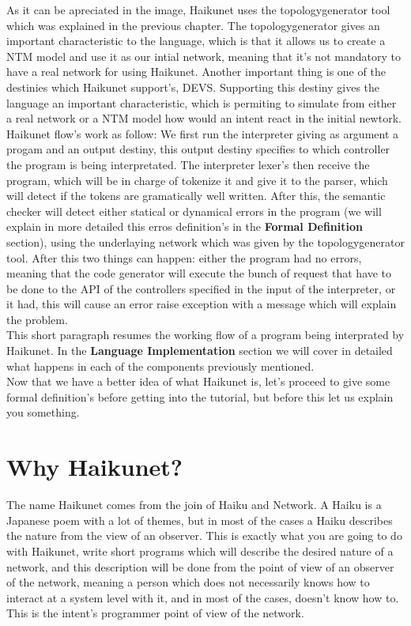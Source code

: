 As it can be apreciated in the image, Haikunet uses the topologygenerator tool which was explained in the previous chapter. The topologygenerator gives an important characteristic to the language, which is that it allows us to create a NTM model and use it as our intial network, meaning that it's not mandatory to have a real network for using Haikunet. Another important thing is one of the destinies which Haikunet support's, DEVS. Supporting this destiny gives the language an important characteristic, which is permiting to simulate from either a real network or a NTM model how would an intent react in the initial newtork.\\

Haikunet flow's work as follow: We first run the interpreter giving as argument a progam and an output destiny, this output destiny specifies to which controller the program is being interpretated. The interpreter lexer's then receive the program, which will be in charge of tokenize it and give it to the parser, which will detect if the tokens are gramatically well written. After this, the semantic checker will detect either statical or dynamical errors in the program (we will explain in more detailed this erros definition's in the \textbf{Formal Definition} section), using the underlaying network which was given by the topologygenerator tool. After this two things can happen: either the program had no errors, meaning that the code generator will execute the bunch of request that have to be done to the API of the controllers specified in the input of the interpreter, or it had, this will cause an error raise exception with a message which will explain the problem. \\

This short paragraph resumes the working flow of a program being interprated by Haikunet. In the \textbf{Language Implementation} section we will cover in detailed what happens in each of the components previously mentioned.\\

Now that we have a better idea of what Haikunet is, let's proceed to give some formal definition's before getting into the tutorial, but before this let us explain you something.

\section{Why Haikunet?}

The name Haikunet comes from the join of Haiku and Network. A Haiku is a Japanese poem with a lot of themes, but in most of the cases a Haiku describes the nature from the view of an observer. This is exactly what you are going to do with Haikunet, write short programs which will describe the desired nature of a network, and this description will be done from the point of view of an observer of the network, meaning a person which does not necessarily knows how to interact at a system level with it, and in most of the cases, doesn't know how to. This is the intent's programmer point of view of the network. 

